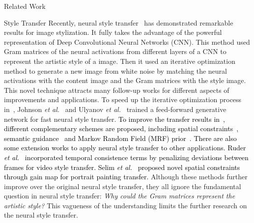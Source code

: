 \begin{section}{Related Work}
\begin{paragraph}{Style Transfer}
Recently, neural style transfer~\cite{neuralart} has demonstrated remarkable results for image stylization. It fully takes the advantage of the powerful representation of Deep Convolutional Neural Networks (CNN). This method used Gram matrices of the neural activations from different layers of a CNN to represent the artistic style of a image. Then it used an iterative optimization method to generate a new image from white noise by matching the neural activations with the content image and the Gram matrices with the style image. This novel technique attracts many follow-up works for different aspects of improvements and applications. To speed up the iterative optimization process in~\cite{neuralart}, Johnson \emph{et al.}~\cite{johnson2016perceptual} and Ulyanov \emph{et al.}~\cite{ulyanov2016texture} trained a feed-forward generative network for fast neural style transfer. %
\textcolor{black}{To improve the transfer results in~\cite{neuralart}, different complementary schemes are proposed, including spatial constraints~\cite{selim2016painting}, semantic guidance~\cite{neuraldoodle} and Markov Random Field (MRF) prior~\cite{li2016combining}. There are also some extension works to apply neural style transfer to other applications. Ruder \emph{et al.}~\cite{ruder2016artistic} incorporated temporal consistence terms by penalizing deviations between frames for video style transfer. Selim \emph{et al.}~\cite{selim2016painting} proposed novel spatial constraints through gain map for portrait painting transfer. }
Although these methods further improve over the original neural style transfer, they all ignore the fundamental question in neural style transfer: \emph{Why could the Gram matrices represent the artistic style?} This vagueness of the understanding limits the further research on the neural style transfer. 
\end{paragraph}


\end{section}
